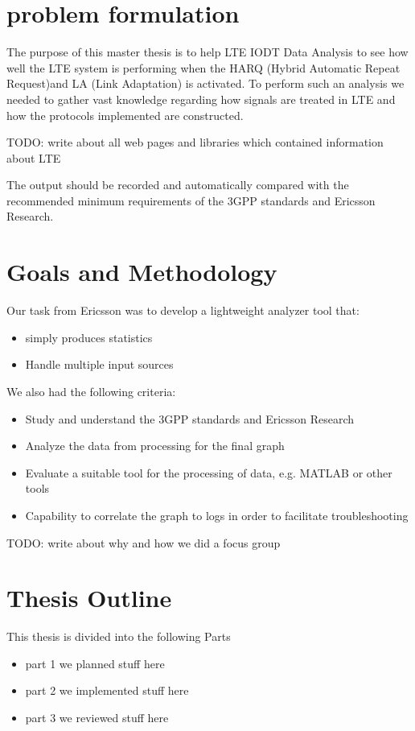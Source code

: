 \documentclass[cropmarks, frame, english]{idamasterthesis}
\begin{document}
\section{problem formulation}
The purpose of this master thesis is to help LTE IODT Data Analysis to see how well the LTE system is performing when the HARQ (Hybrid Automatic Repeat Request)and LA (Link Adaptation) is activated. To perform such an analysis we needed to gather vast knowledge regarding how signals are treated in LTE and how the protocols implemented are constructed.

 


TODO: write about all web pages and libraries which contained information about LTE


The output should be recorded and automatically compared with the recommended minimum requirements of the 3GPP standards and Ericsson Research.

\section{Goals and Methodology}

Our task from Ericsson was to develop a lightweight analyzer tool that:

 \begin{itemize} 
 \item simply produces statistics
 \item Handle multiple input sources
 \end{itemize} 

\setlength{\parindent}{0cm} We also had the following criteria: 
 
  \begin{itemize} 
 \item Study and understand the 3GPP standards and Ericsson Research
 \item Analyze the data from processing for the final graph
 \item Evaluate a suitable tool for the processing of data, e.g. MATLAB or other tools
 \item Capability to correlate the graph to logs in order to facilitate troubleshooting
\end{itemize}

TODO: write about why and how we did a focus group

\section{Thesis Outline}
This thesis is divided into the following Parts
\begin{itemize}
	\item part 1 we planned stuff here
	\item part 2 we implemented stuff here
	\item part 3 we reviewed stuff here
\end{itemize}
\end{document}
